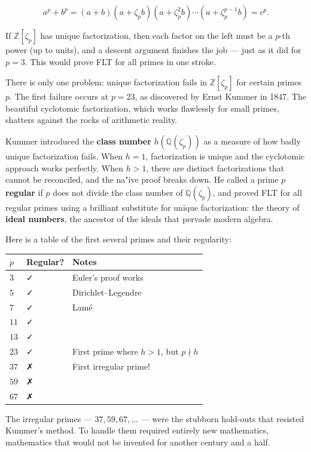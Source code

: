 \[a^p + b^p = (a + b)(a + \zeta_p b)(a + \zeta_p^2 b) \cdots (a + \zeta_p^{p-1} b) = c^p.\]

If \(\mathbb{Z}[\zeta_p]\) has unique factorization, then each factor on the left must be a \(p\)-th power (up to units), and a descent argument finishes the job --- just as it did for \(p = 3\). This would prove FLT for all primes in one stroke.

There is only one problem: unique factorization fails in \(\mathbb{Z}[\zeta_p]\) for certain primes \(p\). The first failure occurs at \(p = 23\), as discovered by Ernst Kummer in 1847. The beautiful cyclotomic factorization, which works flawlessly for small primes, shatters against the rocks of arithmetic reality.

Kummer introduced the \textbf{class number} \(h(\mathbb{Q}(\zeta_p))\) as a measure of how badly unique factorization fails. When \(h = 1\), factorization is unique and the cyclotomic approach works perfectly. When \(h > 1\), there are distinct factorizations that cannot be reconciled, and the na"ive proof breaks down. He called a prime \(p\) \textbf{regular} if \(p\) does not divide the class number of \(\mathbb{Q}(\zeta_p)\), and proved FLT for all regular primes using a brilliant substitute for unique factorization: the theory of \textbf{ideal numbers}, the ancestor of the ideals that pervade modern algebra.

Here is a table of the first several primes and their regularity:

\begin{longtable}[]{@{}lll@{}}
\toprule\noalign{}
\(p\) & Regular? & Notes \\
\midrule\noalign{}
\endhead
\bottomrule\noalign{}
\endlastfoot
\(3\) & ✓ & Euler's proof works \\
\(5\) & ✓ & Dirichlet--Legendre \\
\(7\) & ✓ & Lamé \\
\(11\) & ✓ & \\
\(13\) & ✓ & \\
\(23\) & ✓ & First prime where \(h > 1\), but \(p \nmid h\) \\
\(37\) & ✗ & First irregular prime! \\
\(59\) & ✗ & \\
\(67\) & ✗ & \\
\end{longtable}

The irregular primes --- \(37, 59, 67, \ldots\) --- were the stubborn hold-outs that resisted Kummer's method. To handle them required entirely new mathematics, mathematics that would not be invented for another century and a half.


